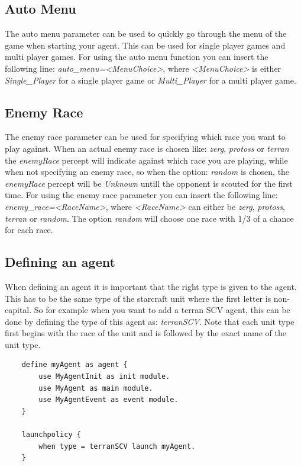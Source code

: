 \subsection{Auto Menu}
\label{auto menu}
The auto menu parameter can be used to quickly go through the menu of the game when starting your agent. This can be used for single player games and multi player games. For using the auto menu function you can insert the following line: \textit{auto\_menu=<MenuChoice>}, where \textit{<MenuChoice>} is either \textit{Single\_Player} for a single player game or \textit{Multi\_Player} for a multi player game.

\subsection{Enemy Race}
\label{enemy race}
The enemy race parameter can be used for specifying which race you want to play against. When an actual enemy race is chosen like: \textit{zerg}, \textit{protoss} or \textit{terran} the \textit{enemyRace} percept will indicate against which race you are playing, while when not specifying an enemy race, so when the option: \textit{random} is chosen, the \textit{enemyRace} percept will be \textit{Unknown} untill the opponent is scouted for the first time. For using the enemy race parameter you can insert the following line: \textit{enemy\_race=<RaceName>}, where \textit{<RaceName>} can either be \textit{zerg}, \textit{protoss}, \textit{terran} or \textit{random}. The option \textit{random} will choose one race with 1/3 of a chance for each race. 

\subsection{Defining an agent}
When defining an agent it is important that the right type is given to the agent. This has to be the same type of the starcraft unit where the first letter is non-capital. So for example when you want to add a terran SCV agent, this can be done by defining the type of this agent as: \textit{terranSCV}. Note that each unit type first begins with the race of the unit and is followed by the exact name of the unit type.

\begin{verbatim}
    define myAgent as agent {  
        use MyAgentInit as init module.
        use MyAgent as main module.
        use MyAgentEvent as event module.
    }
    
    launchpolicy {
        when type = terranSCV launch myAgent.
    }
\end{verbatim}


